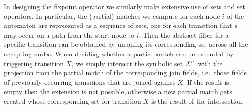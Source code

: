 In designing the fixpoint operator we similarly make extensive use of sets and 
set operators.
In particular, the (partial) matches we compute for each node $i$ of the 
automaton are represented as a sequence of sets, one for each transition that e
may occur on a path from the start node to $i$.
Then the abstract filter for a specific transition can be obtained by unioning 
its corresponding set across all the accepting nodes.
When deciding whether a partial match can be extended by triggering transition 
$X$, we simply intersect the symbolic set ${X}^{\sigma}$ with the projection from 
the partial match of the corresponding join fields, i.e.\ those fields of 
previously occurring transitions that are joined against $X$.
If the result is empty then the extension is not possible, otherwise a new 
partial match gets created whose corresponding set for transition $X$ is the 
result of the intersection.   





 
